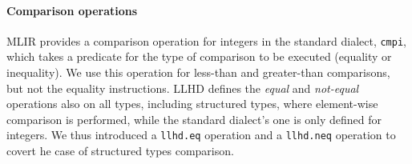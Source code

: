 \paragraph{Comparison operations}
MLIR provides a comparison operation for integers in the standard dialect, \texttt{cmpi}, which takes a predicate for the type of comparison to be executed (\eg equality or inequality). We use this operation for less-than and greater-than comparisons, but not the equality instructions. LLHD defines the \textit{equal} and \textit{not-equal} operations also on all types, including structured types, where element-wise comparison is performed, while the standard dialect's one is only defined for integers. We thus introduced a \texttt{llhd.eq} operation and a \texttt{llhd.neq} operation to covert he case of structured types comparison.

